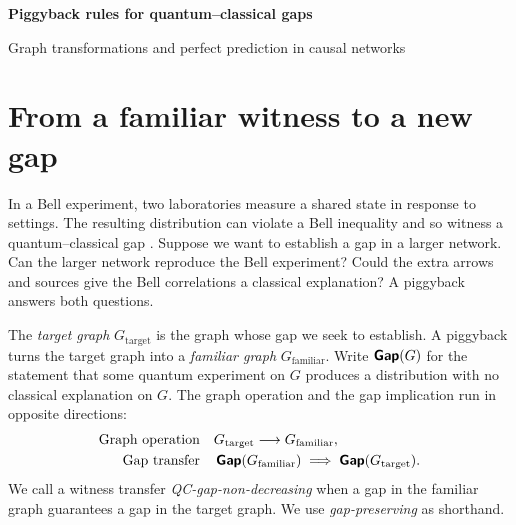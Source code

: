 \documentclass[11pt,a4paper]{article}
\DeclareMathOperator{\gap}{\text{\normalfont\sffamily\bfseries Gap}}
\newcommand{\Gtarget}{G_{\text{target}}}
\newcommand{\Gfamiliar}{G_{\text{familiar}}}
\newcommand{\qcn}{QC-gap-non-decreasing}
\begin{document}
\begin{center}
{\LARGE\sffamily\bfseries Piggyback rules for quantum--classical gaps\par}
\medskip
{\large Graph transformations and perfect prediction in causal networks\par}
\end{center}
\begin{abstract}
A causal network has a quantum--classical gap when an experiment with independent
quantum sources produces correlations that independent classical sources cannot
reproduce on the same network. A \emph{piggyback} uses a witness from one graph to
establish a gap on another. The elementary rules use source degradation, value
fixing, marginalization with or without teleportation, stitching, or postselection.
The Fritz rules use outputs that another laboratory can predict exactly. We
illustrate each rule with a step from the four-node census, where piggybacks and
known witnesses establish gaps in 380 of 426 candidate classes.
\end{abstract}

\section{From a familiar witness to a new gap}\label{sec:setting}
In a Bell experiment, two laboratories measure a shared state in response to
settings. The resulting distribution can violate a Bell inequality and so
witness a quantum--classical gap \cite{Bell}. Suppose we want to establish a
gap in a larger network. Can the larger network reproduce the Bell experiment?
Could the extra arrows and sources give the Bell correlations a classical
explanation? A piggyback answers both questions.

The \emph{target graph} \(\Gtarget\) is the graph whose gap we seek to establish.
A piggyback turns the target graph into a \emph{familiar graph} \(\Gfamiliar\).
Write \(\gap(G)\) for the statement
that some quantum experiment on \(G\) produces a distribution with no classical
explanation on \(G\). The graph operation and the gap implication run in opposite
directions:
\begin{equation}
  \begin{aligned}
  \text{Graph operation} &\quad \Gtarget \longrightarrow \Gfamiliar ,\\
  \text{Gap transfer} &\quad \gap(\Gfamiliar) \implies \gap(\Gtarget) .
  \end{aligned}
  \label{eq:direction}
\end{equation}
We call a witness transfer \emph{\qcn} when a gap in the familiar graph
guarantees a gap in the target graph. We use \emph{gap-preserving} as shorthand.
\end{document}
